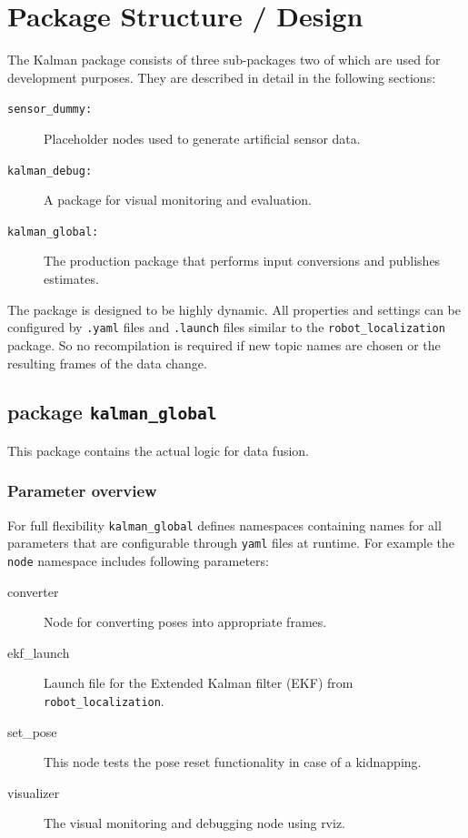 \section{Package Structure / Design}
The Kalman package consists of three sub-packages two of which are used for development purposes. They are described in detail in the following sections:
\begin{description}
\item[\texttt{sensor\_dummy:}] Placeholder nodes used to generate artificial sensor data.
\item[\texttt{kalman\_debug:}] A package for visual monitoring and evaluation.
\item[\texttt{kalman\_global:}] The production package that performs input conversions and publishes estimates.
\end{description}

The package is designed to be highly dynamic. All properties and settings can be configured by \texttt{.yaml} files and \texttt{.launch} files similar to the \texttt{robot\_localization} package. So no recompilation is required if new topic names are chosen or the resulting frames of the data change.

\subsection{package \texttt{kalman\_global}}
This package contains the actual logic for data fusion.

\subsubsection{Parameter overview}
For full flexibility \texttt{kalman\_global} defines namespaces containing names for all parameters that are configurable through \texttt{yaml} files at runtime. For example the \texttt{node} namespace includes following parameters:
\begin{description}
\item[converter] Node for converting poses into appropriate frames.
\item[ekf\_launch] Launch file for the Extended Kalman filter (EKF) from \texttt{robot\_localization}.
\item[set\_pose] This node tests the pose reset functionality in case of a kidnapping.
\item[visualizer] The visual monitoring and debugging node using rviz.
\end{description}

